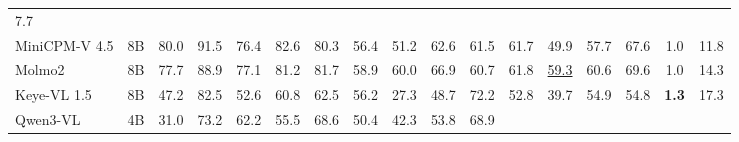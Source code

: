 \begin{tabular}{lcccccccccccccccc}
  \cellcolor[rgb]{0.949,0.866,0.860} 7.7 \\
  MiniCPM-V 4.5 & 8B & \cellcolor[rgb]{0.658,0.572,0.676} 80.0 & \cellcolor[rgb]{0.592,0.539,0.626} 91.5 &
  \cellcolor[rgb]{0.677,0.582,0.688} 76.4 & \cellcolor[rgb]{0.642,0.564,0.665} 82.6 & \cellcolor[rgb]{0.655,0.571,0.674} 80.3 &
  \cellcolor[rgb]{0.785,0.649,0.745} 56.4 & \cellcolor[rgb]{0.809,0.667,0.756} 51.2 & \cellcolor[rgb]{0.754,0.627,0.730} 62.6 &
  \cellcolor[rgb]{0.760,0.631,0.733} 61.5 & \cellcolor[rgb]{0.760,0.631,0.733} 61.7 & \cellcolor[rgb]{0.817,0.674,0.759} 49.9 &
  \cellcolor[rgb]{0.780,0.645,0.742} 57.7 & \cellcolor[rgb]{0.727,0.610,0.717} 67.6 & \cellcolor[rgb]{0.881,0.741,0.791} 1.0 &
  \cellcolor[rgb]{0.940,0.844,0.845} 11.8 \\
  Molmo2 & 8B & \cellcolor[rgb]{0.671,0.579,0.684} 77.7 & \cellcolor[rgb]{0.608,0.547,0.639} 88.9 & \cellcolor[rgb]{0.674,0.581,0.686} 77.1
   & \cellcolor[rgb]{0.652,0.569,0.672} 81.2 & \cellcolor[rgb]{0.646,0.566,0.668} 81.7 & \cellcolor[rgb]{0.774,0.641,0.740} 58.9 &
  \cellcolor[rgb]{0.769,0.637,0.737} 60.0 & \cellcolor[rgb]{0.730,0.612,0.718} 66.9 & \cellcolor[rgb]{0.763,0.633,0.734} 60.7 &
  \cellcolor[rgb]{0.757,0.629,0.732} 61.8 & \cellcolor[rgb]{0.771,0.639,0.738} \underline{59.3} & \cellcolor[rgb]{0.763,0.633,0.734} 60.6 &
   \cellcolor[rgb]{0.715,0.603,0.710} 69.6 & \cellcolor[rgb]{0.885,0.746,0.793} 1.0 & \cellcolor[rgb]{0.935,0.833,0.839} 14.3 \\
  Keye-VL 1.5 & 8B & \cellcolor[rgb]{0.829,0.685,0.765} 47.2 & \cellcolor[rgb]{0.642,0.564,0.665} 82.5 & \cellcolor[rgb]{0.804,0.663,0.753}
   52.6 & \cellcolor[rgb]{0.763,0.633,0.734} 60.8 & \cellcolor[rgb]{0.754,0.627,0.730} 62.5 & \cellcolor[rgb]{0.788,0.651,0.746} 56.2 &
  \cellcolor[rgb]{0.902,0.771,0.805} 27.3 & \cellcolor[rgb]{0.822,0.678,0.761} 48.7 & \cellcolor[rgb]{0.703,0.596,0.703} 72.2 &
  \cellcolor[rgb]{0.802,0.661,0.752} 52.8 & \cellcolor[rgb]{0.859,0.714,0.779} 39.7 & \cellcolor[rgb]{0.794,0.655,0.749} 54.9 &
  \cellcolor[rgb]{0.794,0.655,0.749} 54.8 & \cellcolor[rgb]{0.852,0.707,0.776} \textbf{1.3} & \cellcolor[rgb]{0.928,0.816,0.829} 17.3 \\
  Qwen3-VL & 4B & \cellcolor[rgb]{0.890,0.754,0.797} 31.0 & \cellcolor[rgb]{0.696,0.593,0.700} 73.2 & \cellcolor[rgb]{0.754,0.627,0.730}
  62.2 & \cellcolor[rgb]{0.788,0.651,0.746} 55.5 & \cellcolor[rgb]{0.721,0.607,0.713} 68.6 & \cellcolor[rgb]{0.814,0.672,0.758} 50.4 &
  \cellcolor[rgb]{0.848,0.703,0.773} 42.3 & \cellcolor[rgb]{0.799,0.659,0.751} 53.8 & \cellcolor[rgb]{0.718,0.605,0.712} 68.9 &

\end{tabular}
